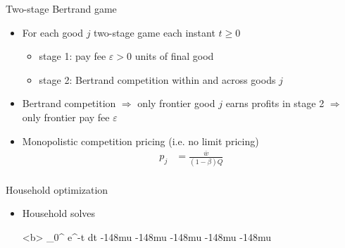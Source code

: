\documentclass[english,usenames,dvipsnames]{beamer}
\begin{document}
\begin{frame}{Two-stage Bertrand game}\label{two_stage_bertrand}
	\hyperlink{characterizing_BGP}{}
	\begin{itemize}
		\item For each good $j$ two-stage game each instant $t \ge 0$
		\begin{itemize}
			\item stage 1: pay fee $\varepsilon > 0$ units of final good
			\item stage 2: Bertrand competition within and across goods $j$
		\end{itemize}
		\item Bertrand competition $\Rightarrow$ only frontier good $j$ earns profits in stage 2 $\Rightarrow$ only frontier pay fee $\varepsilon$
		\item Monopolistic competition pricing (i.e. no limit pricing)
		\begin{align*}
		p_j &= \frac{\overline{w}}{(1-\beta) Q} \\
		\end{align*}
	\end{itemize}
\end{frame}


\begin{frame}{Household optimization}\label{household_optimization}
	\hyperlink{characterizing_BGP}{}
	\begin{itemize}
		\item Household solves
		\tiny
		\begin{maxi*}[1]<b>
			{} {\int_0^{\infty} e^{-\rho t}  dt}{}{}
			  {\mkern-148mu}
			 {\mkern-148mu} 
			  {\mkern-148mu} 
			 {\mkern-148mu}
			 {\mkern-148mu}
		\end{maxi*}
	\end{itemize}
\end{frame}
\end{document}
